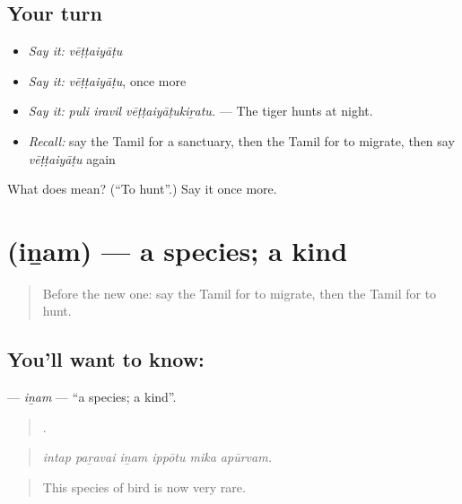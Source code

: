 \subsection*{Your turn}
\begin{itemize}
\raggedright
  \item \emph{Say it:} \emph{vēṭṭaiyāṭu}
  \item \emph{Say it:} \emph{vēṭṭaiyāṭu}, once more
  \item \emph{Say it:} \emph{puli iravil vēṭṭaiyāṭukiṟatu.} — The tiger hunts at night.
  \item \emph{Recall:} say the Tamil for a sanctuary, then the Tamil for to migrate, then say \emph{vēṭṭaiyāṭu} again
\end{itemize}

\begin{tcolorbox}[breakable,colback=teal!4,colframe=teal!35!black,title={Before you move on}]
What does  mean? (\textquotedblleft{}To hunt\textquotedblright{}.) Say it once more.
\end{tcolorbox}
\section[\texorpdfstring{\ta{இனம்} (iṉam)}{இனம் (iṉam)}]{ (iṉam) — a species; a kind}

\label{lesson:TA-C437-inam}



\begin{quote}
Before the new one: say the Tamil for to migrate, then the Tamil for to hunt.
\end{quote}

\subsection*{You'll want to know: }
\textbf{} — \emph{iṉam} — \textquotedblleft{}a species; a kind\textquotedblright{}.

\begin{quote}
     .
\end{quote}

\begin{quote}
\emph{intap paṟavai iṉam ippōtu mika apūrvam.}
\end{quote}

\begin{quote}
This species of bird is now very rare.
\end{quote}

